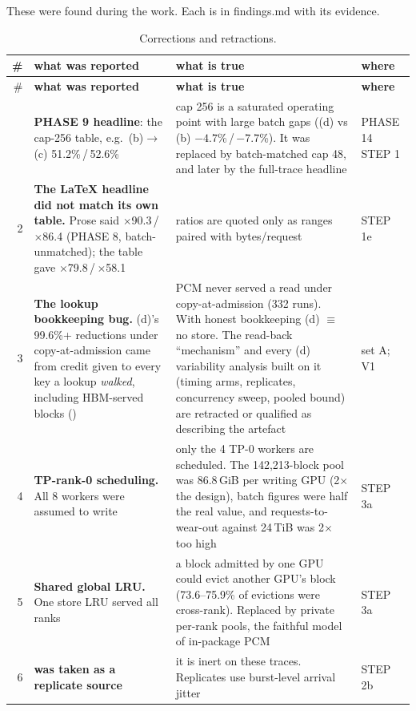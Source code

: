 \documentclass[11pt,a4paper]{article}
\newcommand{\hd}[1]{\textbf{#1}}
\begin{document}
These were found during the work. Each is in findings.md with its evidence.

\begin{xltabular}{\linewidth}{@{}r Y{0.95} Y{1.05} P{22mm}@{}}
\caption{Corrections and retractions.}\label{tab:corrections}\\
\toprule
\# & \hd{what was reported} & \hd{what is true} & \hd{where} \\
\midrule
\endfirsthead
\toprule
\# & \hd{what was reported} & \hd{what is true} & \hd{where} \\
\midrule
\endhead
\bottomrule
{} & \textbf{PHASE 9 headline}: the cap-256 table, e.g.\ (b)$\to$(c) 51.2\%\,/\,52.6\%
  & cap 256 is a saturated operating point with large batch gaps ((d) vs (b) $-4.7$\%\,/\,$-7.7$\%). It was replaced by batch-matched cap 48, and later by the full-trace headline
  & PHASE 14 STEP 1 \\
2 & \textbf{The LaTeX headline did not match its own table.} Prose said $\times$90.3\,/\,$\times$86.4 (PHASE 8, batch-unmatched); the table gave $\times$79.8\,/\,$\times$58.1
  & ratios are quoted only as ranges paired with bytes/request
  & STEP 1e \\
3 & \textbf{The lookup bookkeeping bug.} (d)'s 99.6\%+ reductions under copy-at-admission came from  credit given to every key a lookup \emph{walked}, including HBM-served blocks ()
  & PCM never served a read under copy-at-admission (332 runs). With honest bookkeeping (d) $\equiv$ no store. The read-back ``mechanism'' and every (d) variability analysis built on it (timing arms, replicates, concurrency sweep, pooled bound) are retracted or qualified as describing the artefact
  & set A; V1 \\
4 & \textbf{TP-rank-0 scheduling.} All 8 workers were assumed to write
  & only the 4 TP-0 workers are scheduled. The 142,213-block pool was 86.8\,GiB per writing GPU (2$\times$ the design), batch figures were half the real value, and requests-to-wear-out against 24\,TiB was 2$\times$ too high
  & STEP 3a \\
5 & \textbf{Shared global LRU.} One store LRU served all ranks
  & a block admitted by one GPU could evict another GPU's block (73.6--75.9\% of evictions were cross-rank). Replaced by private per-rank pools, the faithful model of in-package PCM
  & STEP 3a \\
6 & \textbf{ was taken as a replicate source}
  & it is inert on these traces. Replicates use burst-level arrival jitter
  & STEP 2b \\

\end{xltabular}
\end{document}
